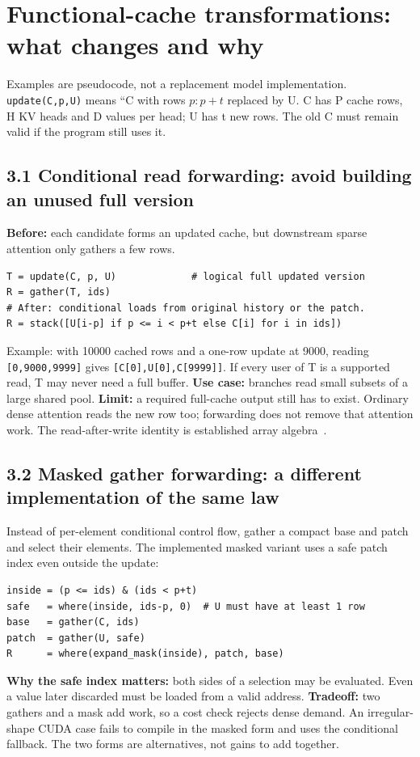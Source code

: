 \documentclass[10pt,a4paper]{article}
\newcommand{\code}[1]{\texttt{#1}}
\newcommand{\smallnote}[1]{{\footnotesize #1\par}}
\begin{document}
\newpage
\section{Functional-cache transformations: what changes and why}
\smallnote{Examples are pseudocode, not a replacement model implementation. \code{update(C,p,U)} means ``C with rows $p:p+t$ replaced by U. C has P cache rows, H KV heads and D values per head; U has t new rows. The old C must remain valid if the program still uses it.}

\subsection*{3.1 Conditional read forwarding: avoid building an unused full version}
\textbf{Before:} each candidate forms an updated cache, but downstream sparse attention only gathers a few rows.
\begin{lstlisting}
T = update(C, p, U)             # logical full updated version
R = gather(T, ids)
# After: conditional loads from original history or the patch.
R = stack([U[i-p] if p <= i < p+t else C[i] for i in ids])
\end{lstlisting}
Example: with 10000 cached rows and a one-row update at 9000, reading \code{[0,9000,9999]} gives \code{[C[0],U[0],C[9999]]}. If every user of T is a supported read, T may never need a full buffer. \textbf{Use case:} branches read small subsets of a large shared pool. \textbf{Limit:} a required full-cache output still has to exist. Ordinary dense attention reads the new row too; forwarding does not remove that attention work. The read-after-write identity is established array algebra~\cite{mccarthy,arrays}.

\subsection*{3.2 Masked gather forwarding: a different implementation of the same law}
Instead of per-element conditional control flow, gather a compact base and patch and select their elements. The implemented masked variant uses a safe patch index even outside the update:
\begin{lstlisting}
inside = (p <= ids) & (ids < p+t)
safe   = where(inside, ids-p, 0)  # U must have at least 1 row
base   = gather(C, ids)
patch  = gather(U, safe)
R      = where(expand_mask(inside), patch, base)
\end{lstlisting}
\textbf{Why the safe index matters:} both sides of a selection may be evaluated. Even a value later discarded must be loaded from a valid address. \textbf{Tradeoff:} two gathers and a mask add work, so a cost check rejects dense demand. An irregular-shape CUDA case fails to compile in the masked form and uses the conditional fallback. The two forms are alternatives, not gains to add together.
\end{document}
